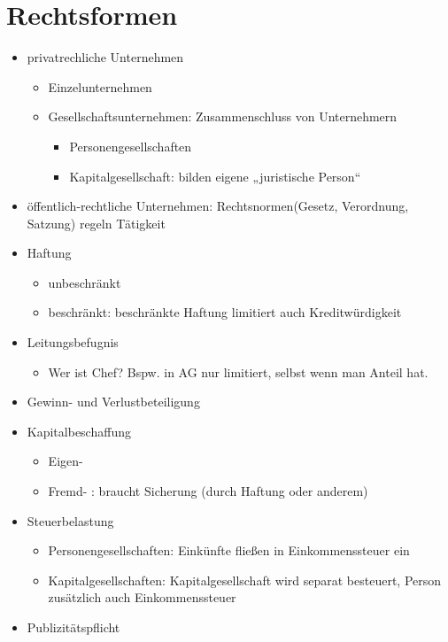 \section{Rechtsformen}
\begin{itemize}
\item privatrechliche Unternehmen
\begin{itemize}
\item Einzelunternehmen
\item Gesellschaftsunternehmen: Zusammenschluss von Unternehmern
\begin{itemize}
\item Personengesellschaften
\item Kapitalgesellschaft: bilden eigene „juristische Person“
\end{itemize}
\end{itemize}
\item öffentlich-rechtliche Unternehmen: Rechtsnormen(Gesetz, Verordnung, Satzung) regeln Tätigkeit
\end{itemize}
\begin{itemize}
\item Haftung
\begin{itemize}
\item unbeschränkt
\item beschränkt: beschränkte Haftung limitiert auch Kreditwürdigkeit
\end{itemize}
\item Leitungsbefugnis
\begin{itemize}
\item Wer ist Chef? Bspw. in AG nur limitiert, selbst wenn man Anteil hat.
\end{itemize}
\item Gewinn- und Verlustbeteiligung
\item Kapitalbeschaffung
\begin{itemize}
\item Eigen-
\item Fremd- : braucht Sicherung (durch Haftung oder anderem)
\end{itemize}
\item Steuerbelastung
\begin{itemize}
\item Personengesellschaften: Einkünfte fließen in Einkommenssteuer ein
\item Kapitalgesellschaften: Kapitalgesellschaft wird separat besteuert, Person zusätzlich auch Einkommenssteuer
\end{itemize}
\item Publizitätspflicht
\end{itemize}
